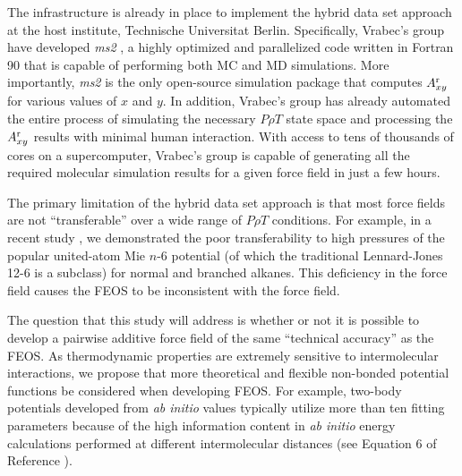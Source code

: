 \documentclass[12pt,a4paper]{article}
\begin{document}
The infrastructure is already in place to implement the hybrid data set approach at the host institute, Technische Universitat Berlin. Specifically, Vrabec's group have developed \textit{ms2} \cite{ms2}, a highly optimized and parallelized code written in Fortran 90 that is capable of performing both MC and MD simulations. More importantly, \textit{ms2} is the only open-source simulation package that computes $A_{xy}^{\rm r}$ for various values of $x$ and $y$. In addition, Vrabec's group has already automated the entire process of simulating the necessary $P \rho T$ state space and processing the $A_{xy}^{\rm r}$ results with minimal human interaction. With access to tens of thousands of cores on a supercomputer, Vrabec's group is capable of generating all the required molecular simulation results for a given force field in just a few hours.
 
 

The primary limitation of the hybrid data set approach is that most force fields are not ``transferable'' over a wide range of $P \rho T$ conditions. For example, in a recent study \cite{Messerly2018_2}, we demonstrated the poor transferability to high pressures of the popular united-atom Mie $n$-6 potential (of which the traditional Lennard-Jones 12-6 is a subclass) for normal and branched alkanes. This deficiency in the force field causes the FEOS to be inconsistent with the force field. 

The question that this study will address is whether or not it is possible to develop a pairwise additive force field of the same ``technical accuracy'' as the FEOS. As thermodynamic properties are extremely sensitive to  intermolecular interactions, we propose that more theoretical and flexible non-bonded potential functions be considered when developing FEOS. For example, two-body potentials developed from \textit{ab initio} values typically utilize more than ten fitting parameters because of the high information content in \textit{ab initio} energy calculations performed at different intermolecular distances (see Equation 6 of Reference ). 
\end{document}
